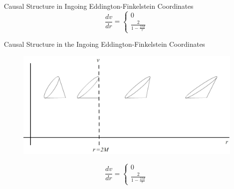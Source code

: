 \documentclass{beamer}
\begin{document}
\begin{darkframes}
\begin{frame}{Causal Structure in Ingoing Eddington-Finkelstein Coordinates}
            $$ \frac{dv}{dr} = \left\lbrace 
            		\begin{array}{c} 0\\
						\frac{2}{1 - \frac{2M}{r}}
					\end{array} \right. $$
    	\end{frame}  
  \end{darkframes}    
  
        \begin{frame}{Causal Structure in the Ingoing Eddington-Finkelstein Coordinates}
        	\begin{center}
				\begin{figure}
				\includegraphics[scale=0.75] {fig2.jpg}
				\end{figure}
                \tiny{
                $$ \frac{dv}{dr} = \left\lbrace 
            		\begin{array}{c} 0\\
						\frac{2}{1 - \frac{2M}{r}}
					\end{array} \right. $$}
			\end{center}
        \end{frame}
\end{document}
